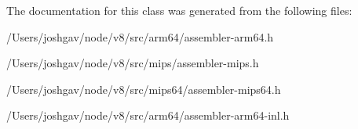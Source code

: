The documentation for this class was generated from the following files\+:\begin{DoxyCompactItemize}
\item 
/\+Users/joshgav/node/v8/src/arm64/assembler-\/arm64.\+h\item 
/\+Users/joshgav/node/v8/src/mips/assembler-\/mips.\+h\item 
/\+Users/joshgav/node/v8/src/mips64/assembler-\/mips64.\+h\item 
/\+Users/joshgav/node/v8/src/arm64/assembler-\/arm64-\/inl.\+h\end{DoxyCompactItemize}
